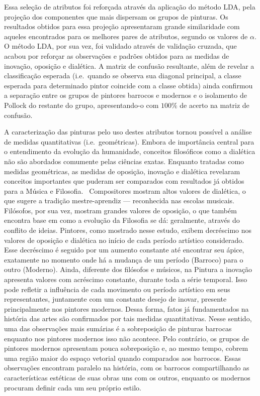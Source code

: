 Essa seleção de atributos foi reforçada através da
aplicação do método LDA, pela projeção dos componentes que mais
dispersam os grupos de pinturas. Os resultados obtidos para essa
projeção apresentaram grande similaridade com aqueles encontrados para
os melhores pares de atributos, segundo os valores de $\alpha$. O
método LDA, por sua vez, foi validado através de validação cruzada,
que acabou por reforçar as observações e padrões obtidos para as
medidas de inovação, oposição e dialética. A matriz de confusão
resultante, além de revelar a classificação esperada (i.e.\ quando se
observa sua diagonal principal, a classe esperada para determinado
pintor coincide com a classe obtida) ainda confirmou a separação entre
os grupos de pintores barrocos e modernos e o isolamento de Pollock do
restante do grupo, apresentando-o com $100\%$ de acerto na matriz de
confusão.

A caracterização das pinturas pelo uso destes atributos tornou
possível a análise de medidas quantitativas (i.e.\ geométricas). Embora de
importância central para o entendimento da evolução da humanidade,
conceitos filosóficos como a dialética não são abordados comumente
pelas ciências exatas. Enquanto tratadas como medidas geométricas, as
medidas de oposição, inovação e dialética revelaram conceitos
importantes que puderam ser comparados com resultados já obtidos para
a Música e Filosofia.~\cite{vieira} Compositores mostram altos valores
de dialética, o que sugere a tradição mestre-aprendiz --- reconhecida
nas escolas musicais. Filósofos, por sua vez, mostram grandes valores
de oposição, o que também encontra base em como a evolução da
Filosofia se dá: geralmente, através do conflito de ideias. Pintores,
como mostrado nesse estudo, exibem decréscimo nos valores de oposição
e dialética no início de cada período artístico considerado. Esse
decréscimo é seguido por um aumento constante até encontrar seu ápice,
exatamente no momento onde há a mudança de um período (Barroco) para o
outro (Moderno). Ainda, diferente dos filósofos e músicos, na Pintura
a inovação apresenta valores com acréscimo constante, durante toda a
série temporal. Isso pode refletir a influência de cada movimento ou
período artístico em seus representantes, juntamente com um constante
desejo de inovar, presente principalmente nos pintores modernos. Dessa
forma, fatos já fundamentados na história das artes são confirmados
por tais medidas quantitativas. Nesse sentido, uma das observações
mais sumárias é a sobreposição de pinturas barrocas enquanto nos
pintores modernos isso não acontece. Pelo contrário, os grupos de
pintores modernos apresentam pouca sobreposição e, ao mesmo tempo,
cobrem uma região maior do espaço vetorial quando comparados aos
barrocos. Essas observações encontram paralelo na história, com os
barrocos compartilhando as características estéticas de suas obras uns
com os outros, enquanto os modernos procuram definir cada um seu
próprio estilo.

